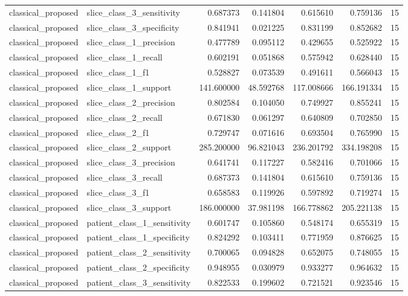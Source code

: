 \begin{tabular}{llrrrrr}
classical_proposed & slice_class_3_sensitivity & 0.687373 & 0.141804 & 0.615610 & 0.759136 & 15 \\
classical_proposed & slice_class_3_specificity & 0.841941 & 0.021225 & 0.831199 & 0.852682 & 15 \\
classical_proposed & slice_class_1_precision & 0.477789 & 0.095112 & 0.429655 & 0.525922 & 15 \\
classical_proposed & slice_class_1_recall & 0.602191 & 0.051868 & 0.575942 & 0.628440 & 15 \\
classical_proposed & slice_class_1_f1 & 0.528827 & 0.073539 & 0.491611 & 0.566043 & 15 \\
classical_proposed & slice_class_1_support & 141.600000 & 48.592768 & 117.008666 & 166.191334 & 15 \\
classical_proposed & slice_class_2_precision & 0.802584 & 0.104050 & 0.749927 & 0.855241 & 15 \\
classical_proposed & slice_class_2_recall & 0.671830 & 0.061297 & 0.640809 & 0.702850 & 15 \\
classical_proposed & slice_class_2_f1 & 0.729747 & 0.071616 & 0.693504 & 0.765990 & 15 \\
classical_proposed & slice_class_2_support & 285.200000 & 96.821043 & 236.201792 & 334.198208 & 15 \\
classical_proposed & slice_class_3_precision & 0.641741 & 0.117227 & 0.582416 & 0.701066 & 15 \\
classical_proposed & slice_class_3_recall & 0.687373 & 0.141804 & 0.615610 & 0.759136 & 15 \\
classical_proposed & slice_class_3_f1 & 0.658583 & 0.119926 & 0.597892 & 0.719274 & 15 \\
classical_proposed & slice_class_3_support & 186.000000 & 37.981198 & 166.778862 & 205.221138 & 15 \\
classical_proposed & patient_class_1_sensitivity & 0.601747 & 0.105860 & 0.548174 & 0.655319 & 15 \\
classical_proposed & patient_class_1_specificity & 0.824292 & 0.103411 & 0.771959 & 0.876625 & 15 \\
classical_proposed & patient_class_2_sensitivity & 0.700065 & 0.094828 & 0.652075 & 0.748055 & 15 \\
classical_proposed & patient_class_2_specificity & 0.948955 & 0.030979 & 0.933277 & 0.964632 & 15 \\
classical_proposed & patient_class_3_sensitivity & 0.822533 & 0.199602 & 0.721521 & 0.923546 & 15 \\

\end{tabular}
